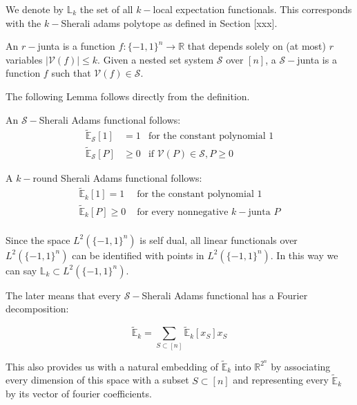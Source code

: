 We denote by $\mathbb{L}_k$ the set of all $k-$local expectation functionals. This corresponds with the $k-$Sherali adams polytope as defined in Section [xxx]. 


\begin{definition}
An $r-$junta is a function $f: \{-1,1\}^n \rightarrow \mathbb{R}$ that depends solely on (at most) $r$ variables $|\mathcal{V}(f)| \leq k$.
Given a nested set system $\mathcal{S}$ over $[n]$, a $\mathcal{S}-$junta is a function $f$ such that $\mathcal{V}(f) \in \mathcal{S}$. 
\end{definition}

The following Lemma follows directly from the definition.

\begin{lemma}
An $\mathcal{S}-$Sherali Adams functional follows:
\begin{align*}
\tilde{\mathbb{E}}_{\mathcal{S}}[1] &= 1 & \text{for the constant polynomial }1 \\
\tilde{\mathbb{E}}_{\mathcal{S}}[P] &\geq 0  & \text{if }  \mathcal{V}(P) \in \mathcal{S}, P \geq 0 
\end{align*}
\end{lemma}



\begin{lemma}
A $k-$round Sherali Adams functional follows:
\begin{align*}
\tilde{\mathbb{E}}_k[ 1 ] = 1  & \text{ for the constant polynomial } 1\\
\tilde{\mathbb{E}}_k[P] \geq 0 & \text{ for every nonnegative $k-$junta } P \\
\end{align*}
\end{lemma}

Since the space $L^2(\{-1,1\}^n)$ is self dual, all linear functionals over $L^2(\{-1,1\}^n)$ can be identified with points in $L^2(\{-1,1\}^n)$. In this way we can say $\mathbb{L}_k \subset L^2(\{-1,1\}^n)$. 

The later means that every $\mathcal{S}-$Sherali Adams functional has a Fourier decomposition: 

\begin{equation*}
\tilde{\mathbb{E}}_k = \sum_{S \subset [n] } \tilde{\mathbb{E}}_k[x_S] x_S
\end{equation*}

This also provides us with a natural embedding of $\tilde{\mathbb{E}}_k$ into $\mathbb{R}^{2^n}$ by associating every dimension of this space with a subset $S \subset [n]$ and representing every $\tilde{\mathbb{E}}_k$ by its vector of fourier coefficients. 

